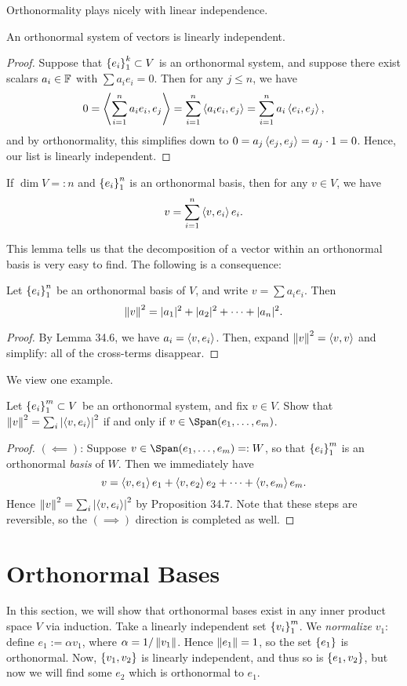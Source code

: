 \documentclass{article}
\begin{document}
Orthonormality plays nicely with linear independence.
\newpage
\begin{lemma}
An orthonormal system of vectors is linearly independent.
\end{lemma}
\begin{proof}
Suppose that $\left\{e_i\right\}_1^k\subset V$ is an orthonormal system, and suppose there exist scalars $a_i\in \mathbb F$ with $\sum a_ie_i = 0$. Then for any $j\leq n$, we have
$$0 = \left\langle\sum_{i=1}^n a_ie_i, e_j\right\rangle = \sum_{i=1}^n \left\langle a_ie_i, e_j\right\rangle = \sum_{i=1}^n a_i\left\langle e_i, e_j\right\rangle,$$
and by orthonormality, this simplifies down to $0=a_j\left\langle e_j, e_j\right\rangle = a_j \cdot 1 = 0$. Hence, our list is linearly independent.
\end{proof}
\begin{lemma}
If $\dim V =: n$  and $\left\{e_i\right\}_1^n$ is an orthonormal basis, then for any $v\in V$, we have
$$v = \sum_{i=1}^n \left\langle v, e_i\right\rangle e_i.$$
\end{lemma}
This lemma tells us that the decomposition of a vector within an orthonormal basis is very easy to find. The following is a consequence:
\begin{proposition}
Let $\left\{e_i\right\}_1^n$ be an orthonormal basis of $V$, and write $v = \sum a_ie_i$. Then
$$\left\Vert v\right\Vert^2 = |a_1|^2 + |a_2|^2 + \cdots + |a_n|^2.$$
\end{proposition}
\begin{proof}
By Lemma 34.6, we have $a_i = \left\langle v, e_i\right\rangle$. Then, expand $\left\Vert v\right\Vert^2 = \left\langle v,v\right\rangle$ and simplify: all of the cross-terms disappear.
\end{proof}
We view one example.
\begin{example}
Let $\left\{e_i\right\}_1^m\subset V$ be an orthonormal system, and fix $v\in V$. Show that $\left\Vert v\right\Vert^2 = \sum_i \left|\left\langle v, e_i\right\rangle\right|^2$ if and only if $v\in \Span(e_1 ,\ldots, e_m)$.
\begin{proof}
$(\impliedby)$: Suppose $v\in \Span(e_1, \ldots, e_m) =: W$, so that $\left\{e_i\right\}_1^m$ is an orthonormal \textit{basis} of $W$. Then we immediately have
$$v = \left\langle v, e_1\right\rangle e_1 + \left\langle v, e_2\right\rangle e_2 + \cdots + \left\langle v, e_m\right\rangle e_m.$$
Hence $\left\Vert v\right\Vert^2 = \sum_i \left|\left\langle v, e_i\right\rangle\right|^2$ by Proposition 34.7. Note that these steps are reversible, so the $(\implies)$ direction is completed as well.
\end{proof}
\end{example}
\section{Orthonormal Bases}
In this section, we will show that orthonormal bases exist in any inner product space $V$ via induction. Take a linearly independent set $\left\{v_i\right\}_1^m$. We \textit{normalize} $v_1$: define $e_1 := \alpha v_1$, where $\alpha = 1/\left\Vert v_1\right\Vert$. Hence $\left\Vert e_1\right\Vert = 1$, so the set $\left\{e_1\right\}$ is orthonormal. Now, $\left\{v_1, v_2\right\}$ is linearly independent, and thus so is $\left\{e_1, v_2\right\}$, but now we will find some $e_2$ which is orthonormal to $e_1$.
\end{document}
